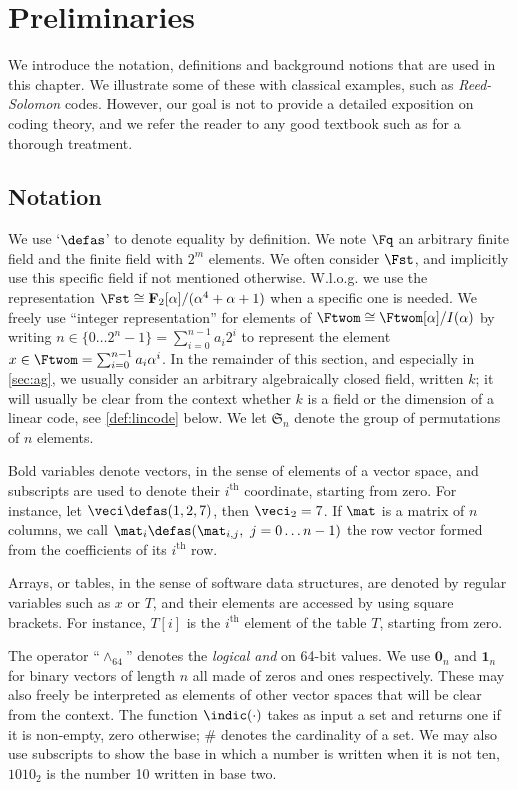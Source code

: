 \section{Preliminaries}
\label{not}

We introduce the notation, definitions and background notions that are used in this chapter. We illustrate some of these with classical examples, such as \emph{Reed-Solomon} codes. However,
our goal is not to provide a detailed exposition on coding theory, and we refer the reader to any good textbook such as \cite{vanlint} for a thorough treatment.

\subsection{Notation}
We use `$\defas$' to denote equality by definition.
We note $\Fq$ an arbitrary finite field and \Ftwom{} the finite field with $2^m$ elements. We often consider $\Fst$, and implicitly use this specific field if not mentioned otherwise.
W.l.o.g. we use the representation
$\Fst \cong \mathbf{F}_2[\alpha]/(\alpha^4 + \alpha + 1)$ when a specific one is needed. We freely use ``integer representation'' for elements of $\Ftwom \cong \Ftwom[\alpha]/I(\alpha)$
by writing $n \in \{0\ldots2^n-1\} = \sum_{i = 0}^{n-1} a_i 2^i$ to represent the element
$x \in \Ftwom = \sum_{i = 0}^{n-1} a_i \alpha^i$. In the remainder of this section, and especially in \autoref{sec:ag}, we usually consider an arbitrary algebraically closed field, written $k$;
it will usually be clear from the context whether $k$ is a field or the dimension of a linear code, see \autoref{def:lincode} below.
We let $\mathfrak{S}_n$ denote the group of permutations of $n$ elements.

Bold variables denote vectors, in the sense of elements of a vector space, and subscripts are used to denote their $i^\text{th}$ coordinate, starting from zero. For instance,
let $\veci \defas (1, 2, 7)$, then  $\veci_2 = 7$.
If $\mat$ is a matrix of $n$ columns, we call $\mat_i \defas (\mat_{i,j},~j = 0\ldots n - 1)$ the row vector formed from the coefficients of
its $i^\text{th}$ row.

Arrays, or tables, in the sense of software data structures, are denoted by regular variables such as $x$ or $T$, and their elements are accessed by using square brackets.
For instance, $T[i]$ is the $i^\text{th}$ element of the table $T$, starting from zero.

The operator ``$\wedge_{64}$'' denotes the  \emph{logical and} on 64-bit values. We use $\mathbf{0}_{n}$ and $\mathbf{1}_n$ for binary vectors of length $n$ all made of
zeros and ones respectively. These may also freely be interpreted as elements of other vector spaces that will be clear from the context.
The function $\indic(\cdot)$ takes as input a set and returns one if it is non-empty, zero otherwise; $\#$ denotes the cardinality of a set.
We may also use subscripts to show the base in which a number is written when it is not ten, \eg $1010_2$ is the number 10 written in base two.

